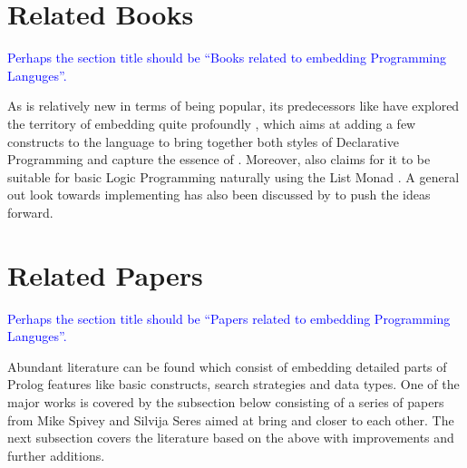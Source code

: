 \documentclass[thesis-solanki.tex]{subfiles}
\begin{document}
\section{Related Books}
\textcolor{blue}{Perhaps the section title should be ``Books related to embedding Programming Languges''.}

As  is relatively new in terms of being popular, its predecessors like  have
explored the territory of embedding  quite profoundly \cite{friedman05reasoned}, which aims at adding a few
constructs to the language to bring together both styles of Declarative Programming and capture the essence of
.
Moreover,  also claims for it to be suitable for basic Logic Programming naturally using the List
Monad \cite{website:logicprogexamplehaskell}.
A general out look towards implementing  has also been discussed by
\cite{krishnamurthi2007programming} to push the ideas forward.

\begin{comment}
All the more \textit{Prologish} things exist in Haskell, as mentioned alone it is not the only one if we consider it in the ''Scheme'' \cite{friedman05reasoned} of things and so is replication to other languages \cite{krishnamurthi2007programming}.
\end{comment}

\begin{comment}
\begin{enumerate}
\item The Reasoned Schemer, Daniel P. Friedman, William E. Byrd, Oleg Kiselyov

\item Programming Languages: Application and Interpretation, Shriram Krishnamurthi,
\\*  Chapters 33-34 of PLAI discuss Prolog and implementing Prolog

\end{enumerate}
\end{comment}

\section{Related Papers}
\textcolor{blue}{Perhaps the section title should be ``Papers related to embedding Programming Languges''.}

Abundant literature 
can be found which consist of embedding detailed parts of Prolog features
like basic constructs, search strategies and data types.
One of the major works is covered by the subsection below consisting of a series of papers from Mike Spivey and
Silvija Seres aimed at bring  and  closer to each other.
The next subsection covers the literature based on the above with improvements and further additions.
\end{document}
